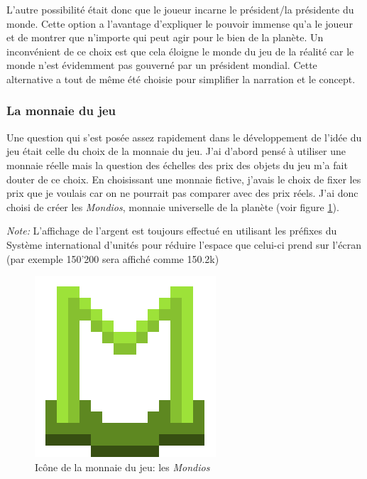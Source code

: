 \documentclass{article}
\begin{document}
        
        L'autre possibilité était donc que le joueur incarne le président/la présidente du monde. Cette option a l'avantage d'expliquer le pouvoir immense qu'a le joueur et de montrer que n'importe qui peut agir pour le bien de la planète.
        Un inconvénient de ce choix est que cela éloigne le monde du jeu de la réalité car le monde n'est évidemment pas gouverné par un président mondial. Cette alternative a tout de même été choisie pour simplifier la narration et le concept.
        

		\subsubsection{La monnaie du jeu}
		Une question qui s'est posée assez rapidement dans le développement de l'idée du jeu était celle du choix de la monnaie du jeu. J'ai d'abord pensé à utiliser une monnaie réelle mais la question des échelles des prix des objets du jeu m'a fait douter de ce choix. En choisissant une monnaie fictive, j'avais le choix de fixer les prix que je voulais car on ne pourrait pas comparer avec des prix réels.
		J'ai donc choisi de créer les \textit{Mondios}, monnaie universelle de la planète (voir figure \ref{fig:mondiosLogo}).
		
		
		\textit{Note: }L'affichage de l'argent est toujours effectué en utilisant les préfixes du Système international d'unités pour réduire l'espace que celui-ci prend sur l'écran (par exemple 150'200 sera affiché comme 150.2k)
		\begin{figure}[H]
                \centerline{\includegraphics[scale=.5]{../images/mondiosLogo}}
                \caption{Icône de la monnaie du jeu: les \textit{Mondios}}
                \label{fig:mondiosLogo}
        \end{figure}
        
        
\end{document}
